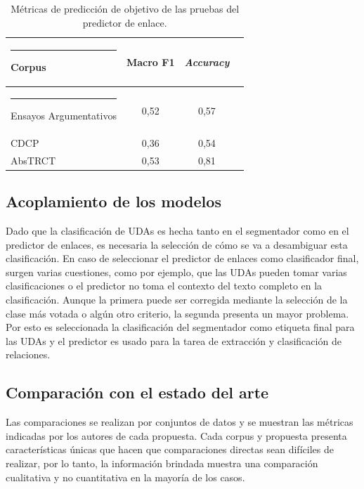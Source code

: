 \documentclass[a4paper,11pt,twocolumn,twoside]{article}
\begin{document}
\begin{table}[h]
	\begin{center}
		\begin{tabular}{|l|c|c|c|} 
			\hline\rule{-2pt}{15pt}
			{\bf Corpus}           & {\bf Macro F1} & {\bf \textit{Accuracy}} \\ 
			\hline\rule{-4pt}{10pt}
			Ensayos Argumentativos & 0,52     & 0,57            \\
			CDCP                   & 0,36     & 0,54            \\
			AbsTRCT                & 0,53     & 0,81            \\ 
			\hline
		\end{tabular}
	\end{center}
	\caption{\label{table:test_target_metrics_link_predictor}Métricas de predicción de objetivo de las pruebas del predictor de enlace.}
\end{table}

\subsection{Acoplamiento de los modelos}

Dado que la clasificación de UDAs es hecha tanto en el segmentador como en el predictor de enlaces, es necesaria 
la selección de cómo se va a desambiguar esta clasificación. En caso de seleccionar el predictor de enlaces como 
clasificador final, surgen varias cuestiones, como por ejemplo, que las UDAs pueden tomar varias clasificaciones o el
predictor no toma el contexto del texto completo en la clasificación. Aunque la primera puede ser corregida
mediante la selección de la clase más votada o algún otro criterio, la segunda presenta un mayor problema. Por
esto es seleccionada la clasificación del segmentador como etiqueta final para las UDAs y el predictor es usado para 
la tarea de extracción y clasificación de relaciones.

\subsection{Comparación con el estado del arte}

Las comparaciones se realizan por conjuntos de datos y se muestran las 
métricas indicadas por los autores de cada propuesta. Cada corpus y propuesta 
presenta características únicas que hacen que comparaciones directas sean 
difíciles de realizar, por lo tanto, la información brindada muestra una comparación 
cualitativa y no cuantitativa en la mayoría de los casos. 
\end{document}
